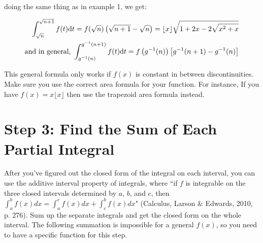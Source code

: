 \documentclass[12pt]{article}
\begin{document}
\begin{minipage}{0.5\textwidth}
		\end{minipage}

		doing the same thing as in example 1, we get:

		\begin{align*}
			\int_{\sqrt n}^{\sqrt{n+1}}f(t)\text dt = f(\sqrt n)\left(\sqrt{n+1}-\sqrt n\right)
			= \lfloor x\rfloor\sqrt{1+2x-2\sqrt{x^2+x}}\\
			\text{and in general, }\int_{g^{-1}(n)}^{g^{-1}(n+1)}f(t)\text dt
			=f\left(g^{-1}(n)\right)\left[g^{-1}(n+1)-g^{-1}(n)\right]
		\end{align*}

		This general formula only works if $f(x)$ is constant in between discontinuities. Make sure you
		use the correct area formula for your function. For instance, If you have $f(x)=x\lfloor x\rfloor$
		then use the trapezoid area formula instead.

\section*{Step 3: Find the Sum of Each Partial Integral}

	After you've figured out the closed form of the integral on each interval, you can use the
	additive interval property of integrals, where ``if $f$ is integrable on the three closed
	intervals determined by $a$, $b$, and $c$, then $\int_a^bf(x)dx=\int_a^cf(x)dx+\int_c^bf(x)dx$"
	(Calculus, Larson \& Edwards, 2010, p. 276). Sum up the separate integrals and get the closed
	form on the whole interval. The following summation is impossible for a general $f(x)$, so you
	need to have a specific function for this step.
\end{document}
